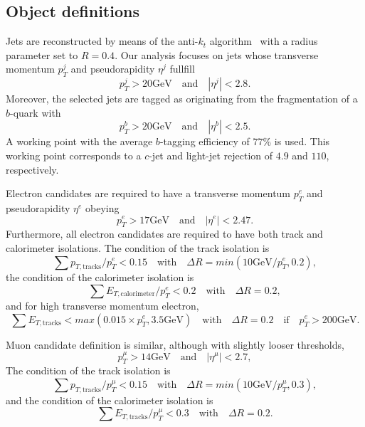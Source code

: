 \documentclass{ws-mpla}
\begin{document}
\subsection{Object definitions}

Jets are reconstructed by means of the anti-$k_t$ algorithm~\cite{Cacciari:2008gp} with a radius parameter set to $R=0.4$. Our analysis focuses on jets whose transverse momentum $p^j_T$ and pseudorapidity $\eta^j$ fullfill
\begin{equation}
p^j_T > 20 \textrm{GeV}\quad \textrm{and}\quad |\eta^j| < 2.8.
\end{equation} 
Moreover, the selected jets are tagged as originating from the fragmentation of a $b$-quark with 
\begin{equation}
p^b_T > 20 \textrm{GeV}\quad \textrm{and}\quad |\eta^b| < 2.5.
\end{equation}
A working point with the average $b$-tagging efficiency of $77\%$ is used. This working point corresponds to a $c$-jet and light-jet rejection of $4.9$ and $110$, respectively.

Electron candidates are required to have a transverse momentum $p^e_T$ and pseudorapidity $\eta^e$ obeying
\begin{equation}
p^e_T > 17 \textrm{GeV}\quad \textrm{and}\quad |\eta^e| < 2.47.
\end{equation}
Furthermore, all electron candidates are required to have both track and calorimeter isolations. The condition of the track isolation is
\begin{equation}
\sum p_{T,\textrm{tracks}}/p^e_T < 0.15\quad \textrm{with}\quad \Delta R=min(10\textrm{GeV}/p^e_T,0.2),
\end{equation}
the condition of the calorimeter isolation is
\begin{equation}
\sum E_{T,\textrm{calorimeter}}/p^e_T < 0.2\quad \textrm{with}\quad \Delta R=0.2,
\end{equation}
and for high transverse momentum electron, 
\begin{equation}
\sum E_{T,\textrm{tracks}} < max(0.015\times p^e_T,3.5\textrm{GeV})\quad \textrm{with}\quad \Delta R=0.2\quad \textrm{if}\quad p^e_T > 200\textrm{GeV}.
\end{equation}

Muon candidate definition is similar, although with slightly looser thresholds,
\begin{equation}
p^{\mu}_T > 14 \textrm{GeV}\quad \textrm{and}\quad |\eta^{\mu}| < 2.7,
\end{equation}
The condition of the track isolation is 
\begin{equation}
\sum p_{T,\textrm{tracks}}/p^{\mu}_T < 0.15\quad \textrm{with}\quad \Delta R=min(10\textrm{GeV}/p^{\mu}_T,0.3),
\end{equation}
and the condition of the calorimeter isolation is
\begin{equation}
\sum E_{T,\textrm{tracks}}/p^{\mu}_T < 0.3\quad \textrm{with}\quad \Delta R=0.2.
\end{equation}
\end{document}
